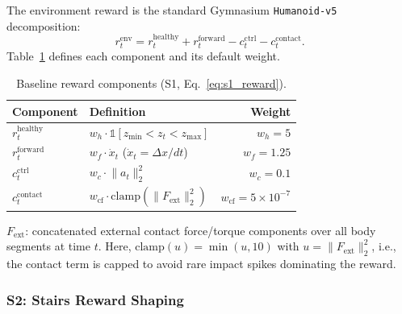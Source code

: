 \documentclass[conference]{IEEEtran}
\begin{document}
The environment reward is the standard Gymnasium \texttt{Humanoid-v5} decomposition:
\begin{equation}
\label{eq:s1_reward}
r_t^{\mathrm{env}} = r_t^{\mathrm{healthy}} + r_t^{\mathrm{forward}} - c_t^{\mathrm{ctrl}} - c_t^{\mathrm{contact}}.
\end{equation}
Table~\ref{tab:reward_base} defines each component and its default weight.


\begin{table}[h!]
\caption{Baseline reward components (S1, Eq.~\ref{eq:s1_reward}).}
\label{tab:reward_base}
\centering
\small
\renewcommand{\arraystretch}{1.3}

\begin{threeparttable}
\begin{tabular}{@{}llr@{}}
\toprule
\textbf{Component} & \textbf{Definition} & \textbf{Weight} \\
\midrule
$r_t^{\mathrm{healthy}}$ & $w_h \cdot \mathbb{1}\!\left[z_{\min} < z_t < z_{\max}\right]$ & $w_h = 5$ \\[2pt]
$r_t^{\mathrm{forward}}$ & $w_f \cdot \dot{x}_t$ \;\; ($\dot{x}_t = \Delta x / dt$) & $w_f = 1.25$ \\[2pt]
$c_t^{\mathrm{ctrl}}$ & $w_c \cdot \lVert a_t \rVert_2^2$ & $w_c = 0.1$ \\[2pt]
$c_t^{\mathrm{contact}}$ & $w_{\mathrm{cf}} \cdot \mathrm{clamp}\!\left(\lVert F_{\mathrm{ext}} \rVert_2^2\right)$\tnote{a} & $w_{\mathrm{cf}} = 5 \!\times\! 10^{-7}$ \\
\bottomrule
\end{tabular}

\begin{tablenotes}[flushleft]
\footnotesize
\item[a] $F_{\mathrm{ext}}$: concatenated external contact force/torque components over all body segments at time $t$. Here, $\mathrm{clamp}(u)=\min(u,10)$ with $u=\lVert F_{\mathrm{ext}} \rVert_2^2$, i.e., the contact term is capped to avoid rare impact spikes dominating the reward.

\end{tablenotes}
\end{threeparttable}

\end{table}



\subsubsection{S2: Stairs Reward Shaping}
\end{document}
